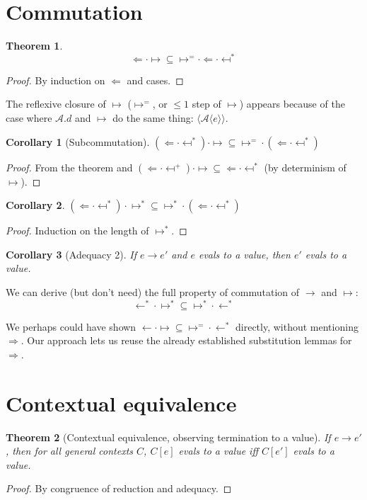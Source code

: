 \documentclass[a4paper, 11pt,titlepage, openright, twoside]{report}
\newcommand{\Int}{\Rightarrow}
\newcommand{\Tni}{\Leftarrow}
\newcommand{\A}{\mathcal{A}}
\newcommand{\+}{\enspace}
\newtheorem{corollary}{Corollary}
\newtheorem{theorem}{Theorem}
\begin{document}
\section{Commutation}

\begin{theorem}
 \label{quasisubcomm}
	$${\Tni · ↦ } ⊆ {↦^= · \Tni · \mapsfrom^*}$$
\end{theorem}
\begin{proof}
	By induction on $\Tni$ and cases.
\end{proof}
The reflexive closure of $↦$ ($↦^=$, or $≤1$ step of $↦$) appears because of the case
where $\A.d$ and $↦$ do the same thing: $⟨\A⟨e⟩⟩$.

\begin{corollary}[Subcommutation]
	${(\Tni · \mapsfrom^*) · ↦} ⊆ {↦^= \mathbin{·} ({{\Tni} · \mapsfrom^*})}$
\end{corollary}
\begin{proof}
	From the theorem %
	and
	${(\Tni · \mapsfrom^+) · ↦} ⊆ {{{\Tni} · \mapsfrom^*}}$ (by determinism of $↦$).
\end{proof}
\begin{corollary}
	${(\Tni · \mapsfrom^*) · ↦^*} ⊆ {↦^* \mathbin{·} ({{\Tni} · \mapsfrom^*})}$
\end{corollary}
\begin{proof}
	Induction on the length of $↦^*$.
\end{proof}
\begin{corollary}[Adequacy 2]
	If $e → e'$ and $e$ evals to a value, then $e'$ evals to a value.
\end{corollary}

We can derive (but don't need) the full property of commutation of $→$ and $↦$:
$${←^* · ↦^*} ⊆ {↦^* · ←^*}$$

We perhaps could have shown ${← · ↦} ⊆ {↦^= · ←^*}$ directly, without mentioning $\Int$.
Our approach lets us reuse the already established substitution lemmas for $\Int$.

\section{Contextual equivalence}

\begin{theorem}[Contextual equivalence, observing termination to a value]
	\label{ctxeqv1}
	If $e → e'$, then for all general contexts $C$, $C[e]$ evals to a value iff $C[e']$ evals to a value.%
\end{theorem}
\begin{proof}
	By congruence of reduction and adequacy.
\end{proof}
\end{document}
